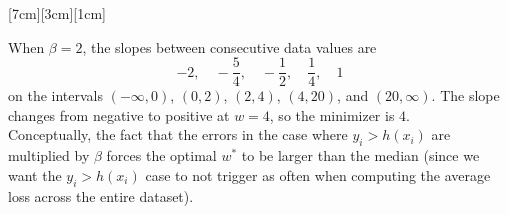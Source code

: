 \documentclass[11pt]{article}
\begin{document}
\begin{prob}[(10 pts)]
\begin{subprob}
[7cm][3cm][1cm]
\begin{solution}
When $\beta=2$, the slopes between consecutive data values are
\[
-2,\quad -\frac54,\quad -\frac12,\quad \frac14,\quad 1
\]
on the intervals $(-\infty,0)$, $(0,2)$, $(2,4)$, $(4,20)$, and $(20,\infty)$. The slope changes from negative to positive at $w=4$, so the minimizer is $\boxed{4}$. \\

Conceptually, the fact that the errors in the case where $y_i > h(x_i)$ are multiplied by $\beta$ forces the optimal $w^*$ to be larger than the median (since we want the $y_i > h(x_i)$ case to not trigger as often when computing the average loss across the entire dataset).
\end{solution}
\end{subprob}





\end{prob}

\newpage
\end{document}
